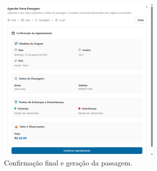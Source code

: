 \begin{figure}[H]
  \centering
  \includegraphics[width=0.7\textwidth]{imagens/wizard-confirmacao.png}
  \caption{Confirmação final e geração da passagem.}
  \label{fig:wizard-confirmacao}
\end{figure}